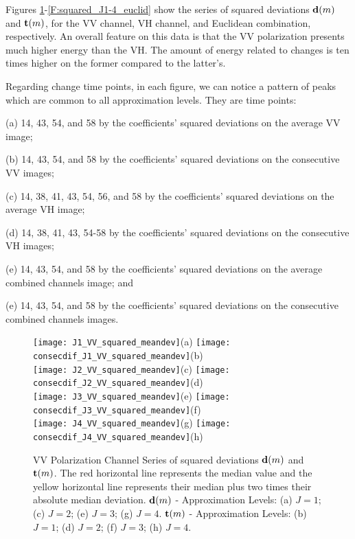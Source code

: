 \documentclass[journal]{IEEEtran}
\newcommand{\vd}{{\textbf d}}
\newcommand{\vt}{{\textbf t}}
\begin{document}
Figures \ref{F:squared_J1-4_VV}-\ref{F:squared_J1-4_euclid} show the series of squared deviations $\vd(m)$ and $\vt(m)$, for  the VV channel, VH channel, and Euclidean combination, respectively.  An overall feature on this data is that the VV polarization presents much higher energy than the VH. The amount of energy related to changes  is ten times higher on the former compared to the latter's.

Regarding change time points, in each figure, we can notice a pattern of peaks which are common to all approximation levels. They are time points:
\begin{list}{}{}
\item (a) 14, 43, 54, and 58 by the coefficients' squared deviations on the average VV image;
\item (b) 14, 43, 54, and 58 by the coefficients' squared deviations on the consecutive VV images;
\item (c) 14, 38, 41, 43, 54, 56, and 58 by the coefficients' squared deviations on the average VH image;
\item (d) 14, 38, 41, 43, 54-58 by the coefficients' squared deviations on the consecutive VH images;
\item (e) 14, 43, 54, and 58 by the coefficients' squared deviations on the average combined channels image; and
\item (e) 14, 43, 54, and 58 by the coefficients' squared deviations on the consecutive combined channels images.
\end{list}

\begin{figure}[htp!]
\texttt{[image: J1\_VV\_squared\_meandev]}(a)
\texttt{[image: consecdif\_J1\_VV\_squared\_meandev]}(b)\\
\texttt{[image: J2\_VV\_squared\_meandev]}(c)
\texttt{[image: consecdif\_J2\_VV\_squared\_meandev]}(d)\\
\texttt{[image: J3\_VV\_squared\_meandev]}(e)
\texttt{[image: consecdif\_J3\_VV\_squared\_meandev]}(f)\\
\texttt{[image: J4\_VV\_squared\_meandev]}(g)
\texttt{[image: consecdif\_J4\_VV\_squared\_meandev]}(h)
\caption{{\sc VV Polarization Channel} Series of squared deviations $\vd(m)$ and $\vt(m)$. The red horizontal line represents the median value and the yellow horizontal line represents their median plus two times their absolute median deviation.  $\vd(m)$ - Approximation Levels:  (a) $J=1$; (c) $J=2$; (e) $J=3$; (g) $J=4$. $\vt(m)$ - Approximation Levels:  (b) $J=1$; (d) $J=2$; (f) $J=3$; (h) $J=4$. 
}
\label{F:squared_J1-4_VV}
\end{figure}
\end{document}
